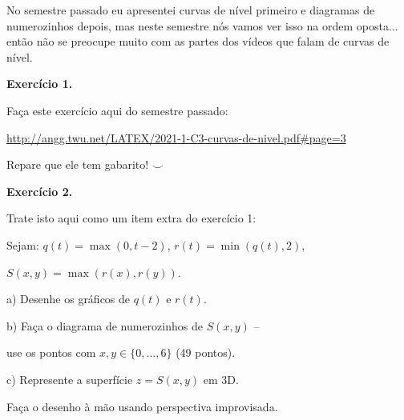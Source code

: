 \documentclass[oneside,12pt]{article}
\begin{document}
\msk

No semestre passado eu apresentei curvas de nível primeiro e diagramas
de numerozinhos depois, mas neste semestre nós vamos ver isso na ordem
oposta... então não se preocupe muito com as partes dos vídeos que
falam de curvas de nível.

\newpage


{\bf Exercício 1.}

Faça este exercício aqui do semestre passado:

\ssk

{\footnotesize

\url{http://angg.twu.net/LATEX/2021-1-C3-curvas-de-nivel.pdf#page=3}

}

\ssk

Repare que ele tem gabarito! $\smile$


\bsk


{\bf Exercício 2.}

Trate isto aqui como um item extra do exercício 1:

Sejam: $q(t) = \max(0, t-2)$, $r(t) = \min(q(t), 2)$,

$S(x,y) = \max(r(x), r(y))$.

\msk

a) Desenhe os gráficos de $q(t)$ e $r(t)$.

b) Faça o diagrama de numerozinhos de $S(x,y)$ --

use os pontos com $x,y∈\{0, \ldots, 6\}$ (49 pontos).

c) Represente a superfície $z=S(x,y)$ em 3D.

Faça o desenho à mão usando perspectiva improvisada.

%
\end{document}
